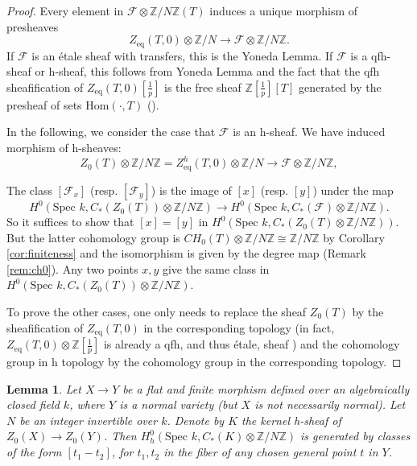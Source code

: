 \documentclass{amsart}
\newtheorem{lem}[theorem]{Lemma}
\theoremstyle{definition}
\theoremstyle{remark}
\newcommand{\mbb}{\mathbb}
\newcommand{\ZZ}{\mbb{Z}}
\newcommand{\SP}{\text{Spec }}
\newcommand{\eq}{\text{eq}}
\begin{document}
\begin{proof}
Every element in $\mathcal{F} \otimes \ZZ/N\ZZ (T)$ induces a unique morphism of presheaves
\[
Z_\eq(T, 0) \otimes \ZZ/N \to \mathcal{F}\otimes \ZZ/N \ZZ.
\]
If $\mathcal{F}$ is an \'etale sheaf with transfers, this is the Yoneda Lemma. 
If $\mathcal{F}$ is a qfh-sheaf or h-sheaf, this follows from Yoneda Lemma and the fact that the qfh sheafification of $Z_\eq(T, 0)[\frac{1}{p}]$ is the free sheaf $\ZZ [\frac{1}{p}] [T]$ generated by the presheaf of sets $\text{Hom}(\cdot, T)$ (\cite[Theorem 6.7]{Suslin_Voevodsky_homology}).

In the following, we consider the case that $\mathcal{F}$ is an h-sheaf. 
We have induced morphism of h-sheaves:
\[
Z_0(T)\otimes \ZZ/N\ZZ=Z_\eq^h(T, 0) \otimes \ZZ/N \to \mathcal{F}\otimes \ZZ/N \ZZ,
\]

The class $[\mathcal{F}_x]$ (resp. $[\mathcal{F}_y]$) is the image of $[x]$ (resp. $[y]$) under the map
\[
H^0(\SP k, C_*(Z_0(T))\otimes \ZZ/N \ZZ) \to H^0(\SP k, C_*(\mathcal{F})\otimes \ZZ/N \ZZ).
\]
So it suffices to show that $[x]=[y]$ in $H^0(\SP k, C_*(Z_0(T)\otimes \ZZ/N \ZZ))$.
But the latter cohomology group is $CH_0(T) \otimes \ZZ/N \ZZ \cong \ZZ/N\ZZ$ by Corollary \ref{cor:finiteness} and the isomorphism is given by the degree map (Remark \ref{rem:ch0}).
Any two points $x, y$ give the same class in $H^0(\SP k, C_*(Z_0(T))\otimes \ZZ/N \ZZ)$.

To prove the other cases, one only needs to replace the sheaf $Z_0(T)$ by the sheafification of $Z_\eq(T, 0)$ in the corresponding topology (in fact, $Z_\eq(T, 0)\otimes \ZZ[\frac{1}{p}]$ is already a qfh, and thus \'etale, sheaf \cite[Proposition 4.2.5]{SV_Chow_Sheaves}) and the cohomology group in h topology by the cohomology group in the corresponding topology.
\end{proof}

\begin{lem}\label{lem:flat_moving}
Let $X \to Y$ be a flat and finite morphism defined over an algebraically closed field $k$, where $Y$ is a normal variety (but $X$ is not necessarily normal). Let $N$ be an integer invertible over $k$.
Denote by $K$ the kernel h-sheaf of $Z_0(X) \to Z_0(Y)$.
Then $H_h^{0}(\SP k, C_*(K)\otimes \ZZ/N\ZZ)$ is generated by classes of the form $[t_1-t_2]$, for $t_1, t_2$ in the fiber of any chosen general point $t$ in $Y$.
\end{lem}
\end{document}

